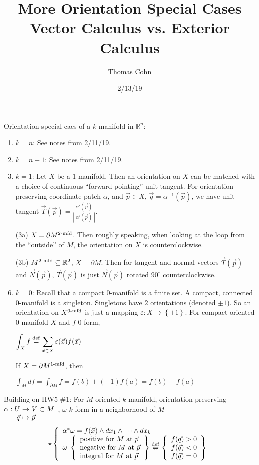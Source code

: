 \documentclass[10pt,letterpaper]{article}
\author{Thomas Cohn}
\title{More Orientation Special Cases\\Vector Calculus vs. Exterior Calculus}
\date{2/13/19} %
\newcommand{\n}{\hfill\break}
\newcommand{\ptxt}[1]{\textrm{\textnormal{#1}}}
\newcommand{\inlineeq}[1]{\centerline{$\displaystyle #1$}}
\newcommand{\set}[1]{\left\{#1\right\}}
\newcommand{\reals}{\mathbb{R}}
\newcommand{\R}{\reals}
\newcommand{\inv}{^{-1}}
\newcommand{\abs}[1]{\left|#1\right|}
\renewcommand{\epsilon}{\varepsilon}
\newcommand{\map}[4]{\!\!\!\begin{array}[t]{rcl}#1 & \!\!\!\!\to & \!\!\!\!#2\\ #3 & \!\!\!\!\mapsto & \!\!\!\!#4\end{array}}
\newcommand{\norm}[1]{\abs{\abs{#1}}}
\newcommand{\iffdef}{\overset{\ptxt{def}}{\Leftrightarrow}}
\newcommand{\eqdef}{\overset{\ptxt{def}}{=}}
\begin{document}
\maketitle
\setlength\RaggedRightParindent{\parindent}
\RaggedRight

\par\noindent Orientation special caes of a $k$-manifold in $\R^{n}$:
\begin{enumerate}[label=(\arabic*)]
	\item $k=n$: See notes from 2/11/19.
	\item $k=n-1$: See notes from 2/11/19.
	\item $k=1$: Let $X$ be a $1$-manifold. Then an orientation on $X$ can be matched with a choice of continuous ``forward-pointing'' unit tangent. For orientation-preserving coordinate patch $\alpha$, and $\vec{p}\in{}X$, $\vec{q}=\alpha\inv(\vec{p})$, we have unit tangent $\vec{T}(\vec{p})=\frac{\alpha'(\vec{p})}{\norm{\alpha'(\vec{p})}}$.
	\item[(3a)] $X=\partial{}M^{2\ptxt{-mfd}}$. Then roughly speaking, when looking at the loop from the ``outside'' of $M$, the orientation on $X$ is counterclockwise.
	\item[(3b)] $M^{2\ptxt{-mfd}}\subseteq\R^{2}$, $X=\partial{}M$. Then for tangent and normal vectors $\vec{T}(\vec{p})$ and $\vec{N}(\vec{p})$, $\vec{T}(\vec{p})$ is just $\vec{N}(\vec{p})$ rotated $90^{\circ}$ counterclockwise.
	\item $k=0$: Recall that a compact $0$-manifold is a finite set. A compact, connected $0$-manifold is a singleton. Singletons have $2$ orientations (denoted $\pm{}1$).\n
	So an orientation on $X^{0\ptxt{-mfd}}$ is just a mapping $\epsilon:X\to\set{\pm{}1}$. For compact oriented $0$-manifold $X$ and $f$ $0$-form,\n
	\inlineeq{
		\int_{X}f\eqdef\sum_{\vec{x}\in{}X}\epsilon(\vec{x})f(\vec{x})
	}
	If $X=\partial{}M^{1\ptxt{-mfd}}$, then\n
	\inlineeq{
		\int_{M}df=\int_{\partial{}M}f=f(b)+(-1)f(a)=f(b)-f(a)
	}
\end{enumerate}

\par\noindent Building on HW5 \#1:\n
For $M$ oriented $k$-manifold, orientation-preserving $\map{\alpha:U}{V\subset{}M}{\vec{q}}{\vec{p}}$, $\omega$ $k$-form in a neighborhood of $M$
\[
\star\left\{\begin{array}{l}\alpha^{*}\omega=f(\vec{x})\wedge{}dx_{1}\wedge\cdots\wedge{}dx_{k}\\
\omega\;\left\{\begin{array}{l}
\ptxt{positive for $M$ at $\vec{p}$}\\
\ptxt{negative for $M$ at $\vec{p}$}\\
\ptxt{integral for $M$ at $\vec{p}$}
\end{array}\right\}\iffdef\left\{
\begin{array}{l}
f(\vec{q})>0\\
f(\vec{q})<0\\
f(\vec{q})=0
\end{array}
\right\}
\end{array}\right.
\]
\end{document}
